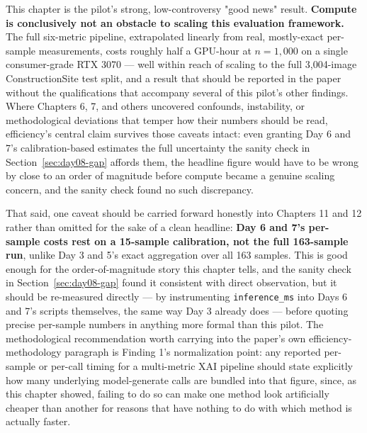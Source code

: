 This chapter is the pilot's strong, low-controversy "good news" result. \textbf{Compute is
conclusively not an obstacle to scaling this evaluation framework.} The full six-metric pipeline,
extrapolated linearly from real, mostly-exact per-sample measurements, costs roughly half a GPU-hour
at $n=1{,}000$ on a single consumer-grade RTX 3070 --- well within reach of scaling to the full
3,004-image ConstructionSite test split, and a result that should be reported in the paper without
the qualifications that accompany several of this pilot's other findings. Where Chapters 6, 7, and
others uncovered confounds, instability, or methodological deviations that temper how their numbers
should be read, efficiency's central claim survives those caveats intact: even granting Day 6 and
7's calibration-based estimates the full uncertainty the sanity check in
Section~\ref{sec:day08-gap} affords them, the headline figure would have to be wrong by close to an
order of magnitude before compute became a genuine scaling concern, and the sanity check found no
such discrepancy.

That said, one caveat should be carried forward honestly into Chapters 11 and 12 rather than
omitted for the sake of a clean headline: \textbf{Day 6 and 7's per-sample costs rest on a
15-sample calibration, not the full 163-sample run}, unlike Day 3 and 5's exact aggregation over all
163 samples. This is good enough for the order-of-magnitude story this chapter tells, and the
sanity check in Section~\ref{sec:day08-gap} found it consistent with direct observation, but it
should be re-measured directly --- by instrumenting \texttt{inference\_ms} into Days 6 and 7's
scripts themselves, the same way Day 3 already does --- before quoting precise per-sample numbers
in anything more formal than this pilot. The methodological recommendation worth carrying into the
paper's own efficiency-methodology paragraph is Finding 1's normalization point: any reported
per-sample or per-call timing for a multi-metric XAI pipeline should state explicitly how many
underlying model-generate calls are bundled into that figure, since, as this chapter showed, failing
to do so can make one method look artificially cheaper than another for reasons that have nothing to
do with which method is actually faster.
